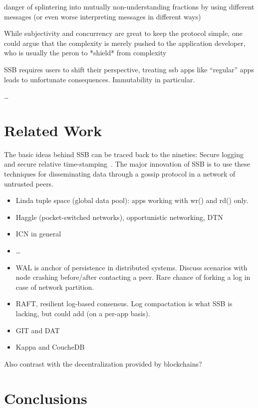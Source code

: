 \documentclass[sigconf]{acmart}
\begin{document}
danger of splintering into mutually non-understanding fractions by using different messages (or even worse interpreting messages in different ways)

While subjectivity and concurrency are great to keep the protocol simple, one could argue that the complexity is merely pushed to the application developer, who is usually the peron to *shield* from complexity

SSB requires users to shift their perspective, treating ssb apps like ``regular'' apps leads to unfortunate consequences. Immutability in particular.

\ldots

\section{Related Work}

The basic ideas behind SSB can be traced back to the nineties: Secure logging~\cite{schneier1998cryptographic} and secure relative time-stamping~\cite{haber1990time}. The major innovation of SSB is to use these techniques for disseminating data through a gossip protocol in a network of untrusted peers.

\begin{itemize}
\item Linda tuple space (global data pool): apps working with wr() and rd() only.
\item Haggle (pocket-switched networks), opportunistic networking, DTN
\item ICN in general
\item \ldots
\item WAL is anchor of persistence in distributed systems. Discuss scenarios with node crashing before/after contacting a peer. Rare chance of forking a log in case of network partition.
\item RAFT, resilient log-based consensus. Log compactation is what SSB is lacking, but could add (on a per-app basis).
\item GIT and DAT
\item Kappa and CoucheDB
\end{itemize}

Also contrast with the decentralization provided by blockchains?

\section{Conclusions}
\end{document}
